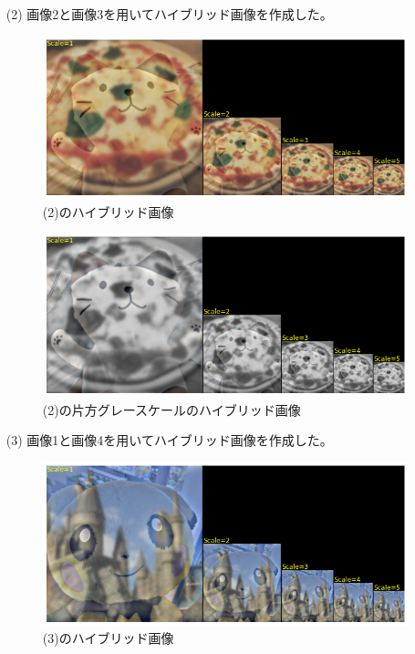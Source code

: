 \documentclass[12pt]{jarticle}
\begin{document}
\begin{itemize}
    \item [(2)]画像2と画像3を用いてハイブリッド画像を作成した。
          \begin{figure}[h]
              \begin{center}
                  \includegraphics[scale=0.7]{kadai4_3_19.png}
              \end{center}
              \caption{(2)のハイブリッド画像}
          \end{figure}

          \clearpage
          \begin{figure}[h]
              \begin{center}
                  \includegraphics[scale=0.7]{kadai4_3_20.png}
              \end{center}
              \caption{(2)の片方グレースケールのハイブリッド画像}
          \end{figure}

    \item [(3)]画像1と画像4を用いてハイブリッド画像を作成した。
          \begin{figure}[h]
              \begin{center}
                  \includegraphics[scale=0.7]{kadai4_3_21.png}
              \end{center}
              \caption{(3)のハイブリッド画像}
          \end{figure}


\end{itemize}
\end{document}
